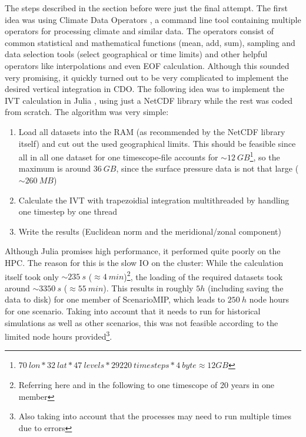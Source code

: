 The steps described in the section before were just the final attempt. 
The first idea was using Climate Data Operators \cite{schulzweida2024}, a command line tool containing multiple operators for processing climate and similar data. 
The operators consist of common statistical and mathematical functions (mean, add, sum), sampling and data selection tools (select geographical or time limits) and other helpful operators like interpolations and even EOF calculation. 
Although this sounded very promising, it quickly turned out to be very complicated to implement the desired vertical integration in CDO.
The following idea was to implement the IVT calculation in Julia \cite{gao_julia_2020}, using just a NetCDF library \cite{barth_ncdatasetsjl_2024} while the rest was coded from scratch. 
The algorithm was very simple: 

\begin{enumerate}[itemsep=0mm]
  \item Load all datasets into the RAM (as recommended by the NetCDF library itself) and cut out the used geographical limits. This should be feasible since all in all one dataset for one timescope-file accounts for $\sim 12~GB$\footnote{$70~lon * 32~lat * 47~levels * 29220~timesteps * 4~byte \approx 12 GB$}, so the maximum is around $36~GB$, since the surface pressure data is not that large ($\sim 260~MB$)   
  \item Calculate the IVT with trapezoidial integration multithreaded by handling one time\-step by one thread
  \item Write the results (Euclidean norm and the meridional/zonal component)
\end{enumerate}

Although Julia promises high performance, it performed quite poorly on the HPC.
The reason for this is the slow IO on the cluster: While the calculation itself took only $\sim 235~s$ ($\approx 4~min$)\footnote{Referring here and  in the following to one timescope of 20 years in one member}, the loading of the required datasets took around $\sim 3350~s$ ($\approx 55~min$). 
This results in roughly $5 h$ (including saving the data to disk) for one member of ScenarioMIP, which leads to $250~h$ node hours for one scenario. 
Taking into account that it needs to run for historical simulations as well as other scenarios, this was not feasible according to the limited node hours provided\footnote{Also taking into account that the processes may need to run multiple times due to errors}.


